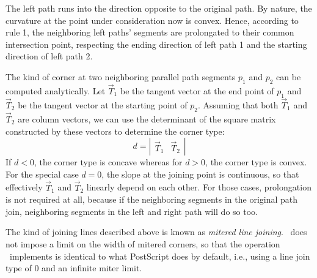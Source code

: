 The left path runs into the direction opposite to the original path. By
nature, the curvature at the point under consideration now is convex. Hence,
according to rule 1, the neighboring left paths' segments are prolongated to
their common intersection point, respecting the ending direction of left
path 1 and the starting direction of left path 2.

The kind of corner at two neighboring parallel path segments $p_1$ and $p_2$
can be computed analytically. Let $\vec{T}_1$ be the tangent vector at the end
point of $p_1$ and $\vec{T}_2$ be the tangent vector at the starting point of
$p_2$. Assuming that both $\vec{T}_1$ and $\vec{T}_2$ are column vectors, we
can use the determinant of the square matrix constructed by these vectors to
determine the corner type:
\begin{equation}
  \label{eq:eq20}
  d = 
  \left| 
    \begin{array}{cc}
      \vec{T}_1 & \vec{T}_2
    \end{array}
  \right|
\end{equation}
If $d<0$, the corner type is concave whereas for $d>0$, the corner type is
convex. For the special case $d=0$, the slope at the joining point is
continuous, so that effectively $\vec{T}_1$ and $\vec{T}_2$ linearly depend on
each other. For those cases, prolongation is not required at all, because if
the neighboring segments in the original path join, neighboring segments in the
left and right path will do so too.

The kind of joining lines described above is known as {\em mitered line
  joining}. \tonelib\ does not impose a limit on the width of mitered corners,
so that the operation \tonelib\ implements is identical to what PostScript
does by default, i.e., using a line join type of 0 and an infinite miter
limit.   

